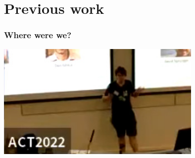 \section{Previous work}

\begin{frame}
    \frametitle{Where were we?}

    \centering
    \includegraphics[width=0.75\textwidth]{imgs/act2022}

\end{frame}

